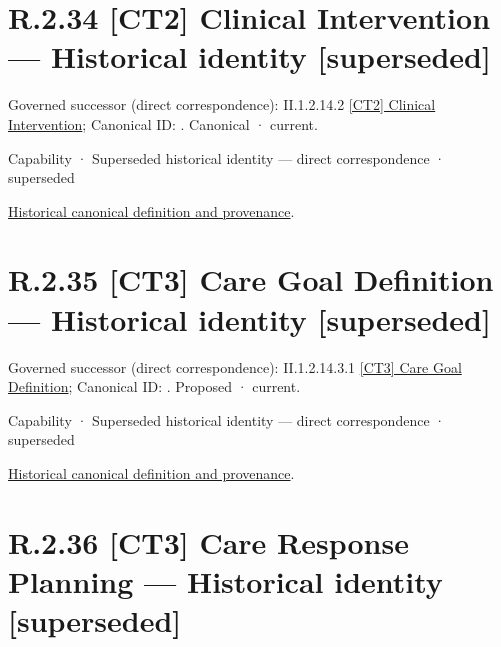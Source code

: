 \section*{R.2.34 [CT2] Clinical Intervention — Historical identity [superseded]}
\label{navigation:R.2.34}

{\small Governed successor (direct correspondence): II.1.2.14.2 \hyperref[element:5359d1b0ff814a0e871384469f5ebcd7]{[CT2] Clinical Intervention}; Canonical ID: \texttt{}. Canonical · current.}\par
\label{element:958345ee65f446d3b1259b8895ab100f}
{\small Capability · Superseded historical identity — direct correspondence · superseded}\par
\href{../../../../continuum/strategy/capability/958345ee65f446d3b1259b8895ab100f.md}{Historical canonical definition and provenance}.\par
\section*{R.2.35 [CT3] Care Goal Definition — Historical identity [superseded]}
\label{navigation:R.2.35}

{\small Governed successor (direct correspondence): II.1.2.14.3.1 \hyperref[element:609e1bef516b44bb976b5dbebe7f684b]{[CT3] Care Goal Definition}; Canonical ID: \texttt{}. Proposed · current.}\par
\label{element:8bfbcc0a455d423c90ae2f1cfb732ca8}
{\small Capability · Superseded historical identity — direct correspondence · superseded}\par
\href{../../../../continuum/strategy/capability/8bfbcc0a455d423c90ae2f1cfb732ca8.md}{Historical canonical definition and provenance}.\par
\section*{R.2.36 [CT3] Care Response Planning — Historical identity [superseded]}
\label{navigation:R.2.36}

